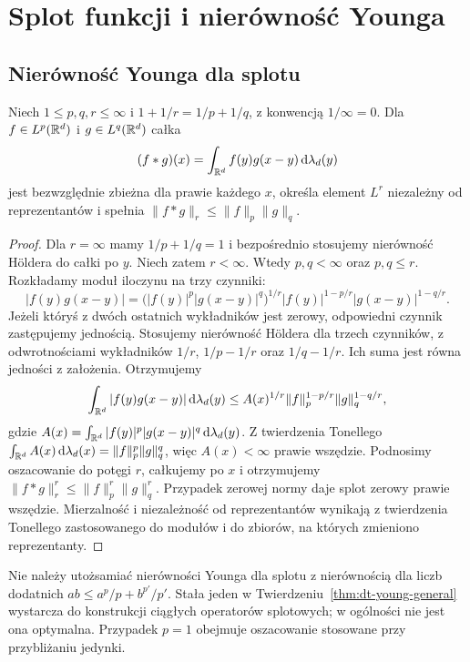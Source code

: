 \section{Splot funkcji i nierówność Younga}
\providecommand{\atlasref}[2]{#2}

\subsection{Nierówność Younga dla splotu}

\begin{twierdzenie}
\label{thm:dt-young-general}
Niech $1\le p,q,r\le\infty$ i
$1+1/r=1/p+1/q$, z konwencją $1/\infty=0$.
Dla $f\in L^p(\mathbb R^d)$ i $g\in L^q(\mathbb R^d)$ całka
\[
 (f*g)(x)=\int_{\mathbb R^d}f(y)g(x-y)\,\mathrm d\lambda_d(y)
\]
jest bezwzględnie zbieżna dla prawie każdego $x$,
określa element $L^r$ niezależny od reprezentantów
i spełnia $\|f*g\|_r\le\|f\|_p\|g\|_q$.
\end{twierdzenie}
\begin{proof}
Dla $r=\infty$ mamy $1/p+1/q=1$ i bezpośrednio
stosujemy nierówność Höldera do całki po $y$.
Niech zatem $r<\infty$. Wtedy $p,q<\infty$ oraz
$p,q\le r$. Rozkładamy moduł iloczynu na trzy czynniki:
\[
 |f(y)g(x-y)|
 =\bigl(|f(y)|^p|g(x-y)|^q\bigr)^{1/r}
 |f(y)|^{1-p/r}|g(x-y)|^{1-q/r}.
\]
Jeżeli któryś z dwóch ostatnich wykładników jest zerowy,
odpowiedni czynnik zastępujemy jednością.
Stosujemy nierówność Höldera dla trzech czynników,
z odwrotnościami wykładników
$1/r$, $1/p-1/r$ oraz $1/q-1/r$.
Ich suma jest równa jedności z założenia.
Otrzymujemy
\[
 \int_{\mathbb R^d}|f(y)g(x-y)|\,\mathrm d\lambda_d(y)
 \le A(x)^{1/r}\|f\|_p^{1-p/r}\|g\|_q^{1-q/r},
\]
gdzie
$A(x)=\int_{\mathbb R^d}|f(y)|^p|g(x-y)|^q\,\mathrm d\lambda_d(y)$.
Z twierdzenia Tonellego
$\int_{\mathbb R^d} A(x)\,\mathrm d\lambda_d(x)=\|f\|_p^p\|g\|_q^q$,
więc $A(x)<\infty$ prawie wszędzie.
Podnosimy oszacowanie do potęgi $r$, całkujemy po $x$
i otrzymujemy $\|f*g\|_r^r\le\|f\|_p^r\|g\|_q^r$.
Przypadek zerowej normy daje splot zerowy prawie wszędzie.
Mierzalność i niezależność od reprezentantów wynikają
z twierdzenia Tonellego zastosowanego do modułów i
do zbiorów, na których zmieniono reprezentanty.
\end{proof}

\begin{uwaga}
\label{rem:dt-young-scope}
Nie należy utożsamiać nierówności Younga dla splotu
z nierównością dla liczb dodatnich
$ab\le a^p/p+b^{p'}/p'$.
Stała jeden w Twierdzeniu~\ref{thm:dt-young-general}
wystarcza do konstrukcji ciągłych operatorów splotowych;
w ogólności nie jest ona optymalna. Przypadek $p=1$
obejmuje oszacowanie stosowane przy przybliżaniu jedynki.
\end{uwaga}
